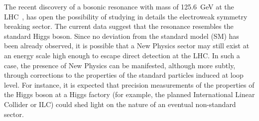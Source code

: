 \documentclass{ws-mpla}
\renewcommand{\(}{\left(}
\renewcommand{\)}{\right)}
\renewcommand{\[}{\left[}
\renewcommand{\]}{\right]}
\begin{document}




The recent discovery of a bosonic resonance with mass of \SI{125.6}{\GeV} at the LHC~\cite{Aaltonen:2012qt,Aad:2012tfa,Chatrchyan:2012ufa}, has open the possibility of studying in details the electroweak symmetry breaking sector. The current data suggest that the resonance resembles the standard Higgs boson.   Since no deviation from the standard model (SM) has been already observed, it is possible that a New Physics sector may still exist at an energy scale high enough to escape direct detection at the LHC. In such a case, the presence of New Physics can be manifested, although more subtly, through corrections to the properties of the standard particles induced at loop level. For instance, it is expected that  precision measurements of the properties of the Higgs boson at a Higgs factory (for example, the planned International Linear Collider or ILC) could shed light on the nature of an eventual non-standard sector.
\end{document}
